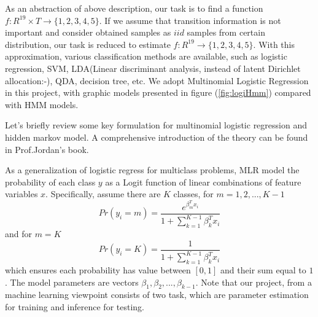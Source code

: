 As an abstraction of above description, our task is to find a function $f: R^{19}\times T \rightarrow \{1,2,3,4,5\}$. If we assume that transition information is not important and consider obtained samples as $iid$ samples from certain distribution, our task is reduced to estimate $f: R^{19} \rightarrow \{1,2,3,4,5\}$. With this approximation, various classification methods are available, such as logistic regression, SVM, LDA(Linear discriminant analysis, instead of latent Dirichlet allocation:-), QDA, decision tree, etc. We adopt Multinomial Logistic Regression in this project, with graphic models presented in figure (\ref{fig:logiHmm}) compared with HMM models.


Let's briefly review some key formulation for multinomial logistic regression and hidden markov model. A comprehensive introduction of the theory can be found in Prof.Jordan's book. 

As a generalization of logistic regress for multiclass problems, MLR model the probability of each class $y$ as a Logit function of linear combinations of feature variables $x$. Specifically, assume there are $K$ classes, for $m=1,2,...,K-1$
\begin{equation}
Pr(y_i=m) = \frac{e^{\beta_m^Tx_i}}{1+\sum_{k=1}^{K-1}\beta_k^Tx_i}
\end{equation}
and for $m=K$
\begin{equation}
Pr(y_i=K) = \frac{1}{1+\sum_{k=1}^{K-1}\beta_k^Tx_i}
\end{equation}
which ensures each probability has value between $[0,1]$ and their sum equal to $1$. The model parameters are vectors $\beta_1,\beta_2,...,\beta_{k-1}$. Note that our project, from a machine learning viewpoint consists of two task, which are parameter estimation for training and inference for testing. 

